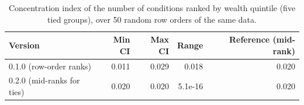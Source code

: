 \begin{table}

\caption{\label{tab:tab_validation_ties}Concentration index of the number of conditions ranked by wealth quintile (five tied groups), over 50 random row orders of the same data.}
\centering
\begin{tabular}[t]{lrrrr}
\toprule
Version & Min CI & Max CI & Range & Reference (mid-rank)\\
\midrule
0.1.0 (row-order ranks) & 0.011 & 0.029 & 0.018 & 0.020\\
0.2.0 (mid-ranks for ties) & 0.020 & 0.020 & 5.1e-16 & 0.020\\
\bottomrule
\end{tabular}
\end{table}
